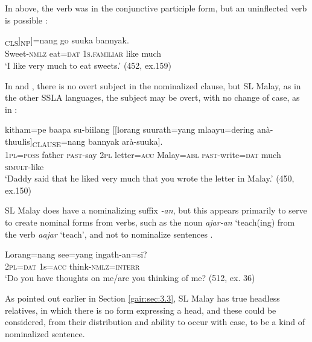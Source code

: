  In  above, the verb was in the conjunctive participle form, but an uninflected verb is possible :


\ea\label{ex3.6.9} 
\textsubscript{CLS}]\textsubscript{NP}]=nang go suuka bannyak.\\
  Sweet-\textsc{nmlz} eat=\textsc{dat}  1\textsc{s.familiar} like much\\
  `I like very much to eat sweets.'  (452, ex.159)
\z


 In  and , there is no overt subject in the nominalized clause, but SL Malay, as in the other SSLA languages, the subject may be overt, with no change of case, as in  :


\ea\label{ex3.6.10} 
\gll  kitham=pe baapa su-biilang [[lorang suurath=yang  mlaayu=dering anà-thuulis]\textsubscript{CLAUSE}=nang bannyak arà-suuka].\\
  1\textsc{pl}=\textsc{poss} father \textsc{past}-say 2\textsc{pl}  letter=\textsc{acc} Malay=\textsc{abl}    \textsc{past}-write=\textsc{dat} much \textsc{simult}-like\\
    `Daddy said that he liked very much that you wrote the letter in Malay.'  (450, ex.150)
\z


 SL Malay does have a nominalizing suffix \textit{-an}, but this appears primarily to serve to create nominal forms from verbs, such as the noun \textit{ajar-an} `teach(ing)  from the verb \textit{aajar} `teach', and not to nominalize sentences .


\ea\label{ex3.6.11} 
\gll  Lorang=nang see=yang ingath-an=si?\\
  2\textsc{pl}=\textsc{dat}  1s=\textsc{acc}  think-\textsc{nmlz}=\textsc{interr}\\
  `Do you have thoughts on me/are you thinking of me?   (512, ex. 36)
\z


 As pointed out earlier in Section \ref{gair:sec:3.3}, SL Malay has true headless relatives, in which there is no form expressing a head, and these  could be considered, from their distribution and ability to occur with case, to be a kind of nominalized sentence.

